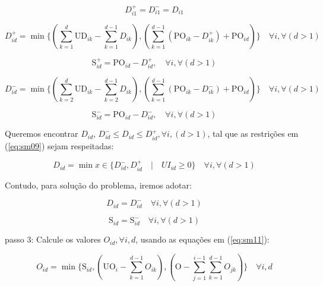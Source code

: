 \documentclass[authoryear,preprint,12pt]{elsarticle}
\begin{document}
\begin{equation}
\label{eq:sm04}
D_{i1}^+ = D_{i1}^- = D_{i1}
\end{equation}

\begin{equation}
\label{eq:sm05}
D_{id}^+ =  \min\{(\sum_{k=1}^{d}{\textrm{UD}_{ik}} - \sum_{k=1}^{d-1}{D_{ik}}), (\sum_{k=1}^{d-1}{(\textrm{PO}_{ik} - D_{ik}^+) + \textrm{PO}_{id}})\}  \quad \forall i, \forall (d>1)
\end{equation}

\begin{equation}
\label{eq:sm06}
\textrm{S}_{id}^+ = \textrm{PO}_{id} - D_{id}^+, \quad \forall i, \forall (d>1)
\end{equation}

\begin{equation}
\label{eq:sm07}
D_{id}^- =  \min\{(\sum_{k=2}^{d}{\textrm{UD}_{ik}} - \sum_{k=2}^{d-1}{D_{ik}}), (\sum_{k=1}^{d-1}{(\textrm{PO}_{ik} - D_{ik}^-) + \textrm{PO}_{id}})\}  \quad \forall i, \forall (d>1)
\end{equation}

\begin{equation}
\label{eq:sm08}
\textrm{S}_{id}^- = \textrm{PO}_{id} - D_{id}^-, \quad \forall i, \forall (d>1)
\end{equation}

Queremos encontrar $D_{id}$, $ D_{id}^- \leq D_{id} \leq D_{id}^+, \forall i,(d>1) $, tal que as restrições em (\ref{eq:sm09}) sejam respeitadas:

\begin{equation}
\label{eq:sm09}
D_{id} = \min {x \in \{D_{id}^-, D_{id}^+ \quad | \quad UI_{id} \geq 0\}} \quad \forall i, \forall (d>1)
\end{equation}

Contudo, para solução do problema, iremos adotar:

\begin{equation}
\label{eq:sm10}
D_{id} = D_{id}^- \quad \forall i, \forall (d>1)
\end{equation}

\begin{equation}
\label{eq:sm10}
\textrm{S}_{id} = \textrm{S}_{id}^- \quad \forall i, \forall (d>1)
\end{equation}

passo 3: Calcule os valores $O_{id}, \forall i, d$, usando as equações em (\ref{eq:sm11}):

\begin{equation}
\label{eq:sm11}
O_{id} = \min \{\textrm{S}_{id}, (\textrm{UO}_i - \sum_{k=1}^{d-1}{O_{ik}}) , (\textrm{O}- \sum_{j=1}^{i-1}\sum_{k=1}^{d-1}{O_{jk}}) \} \quad \forall i, d
\end{equation}
\end{document}
